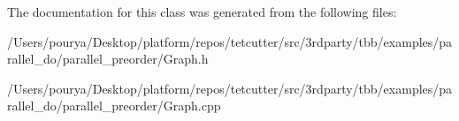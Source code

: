 The documentation for this class was generated from the following files\+:\begin{DoxyCompactItemize}
\item 
/\+Users/pourya/\+Desktop/platform/repos/tetcutter/src/3rdparty/tbb/examples/parallel\+\_\+do/parallel\+\_\+preorder/Graph.\+h\item 
/\+Users/pourya/\+Desktop/platform/repos/tetcutter/src/3rdparty/tbb/examples/parallel\+\_\+do/parallel\+\_\+preorder/Graph.\+cpp\end{DoxyCompactItemize}
